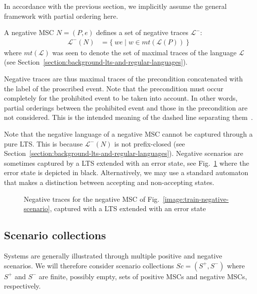 In accordance with the previous section, we implicitly assume the general framework with partial ordering here.

A negative MSC $N = (P,e)$ defines a set of negative traces $\mathcal{L}^{-}$:
\begin{align}
\mathcal{L}^{-}(N) &= \{~we \mid w \in mt(\mathcal{L}(P))~\}
\end{align}
\noindent where $mt(\mathcal{L})$ was seen to denote the set of maximal traces of the language $\mathcal{L}$ (see Section~\ref{section:background-lts-and-regular-languages}).

Negative traces are thus maximal traces of the precondition concatenated with the label of the proscribed event. Note that the precondition must occur completely for the prohibited event to be taken into account. In other words, partial orderings between the prohibited event and those in the precondition are not considered. This is the intended meaning of the dashed line separating them~\cite{Uchitel:2004}. 

Note that the negative language of a negative MSC cannot be captured through a pure LTS. This is because $\mathcal{L}^{-}(N)$ is not prefix-closed (see Section~\ref{section:background-lts-and-regular-languages}). Negative scenarios are sometimes captured by a LTS extended with an error state, see Fig.~\ref{image:negative-trace-lts} where the error state is depicted in black. Alternatively, we may use a standard automaton that makes a distinction between accepting and non-accepting states.

\begin{figure}\centering
{}
\caption[Negative traces for a negative MSC]{Negative traces for the negative MSC of Fig.~\ref{image:train-negative-scenario}, captured with a LTS extended with an error state\label{image:negative-trace-lts}}
\end{figure}

\subsection{Scenario collections\label{subsection:background-scenario-collections}}

Systems are generally illustrated through multiple positive and negative scenarios. We will therefore consider scenario collections $Sc = (S^+,S^-)$ where $S^+$ and $S^-$ are finite, possibly empty, sets of positive MSCs and negative MSCs, respectively.

